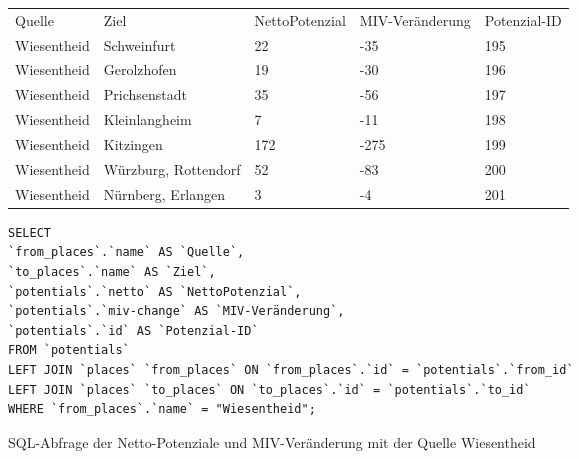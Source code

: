 \begin{tabular}{ l  l  l  l  l }
Quelle & Ziel & NettoPotenzial & MIV-Veränderung & Potenzial-ID\\ 
Wiesentheid & Schweinfurt & 22 & -35 & 195\\ 
Wiesentheid & Gerolzhofen & 19 & -30 & 196\\ 
Wiesentheid & Prichsenstadt & 35 & -56 & 197\\ 
Wiesentheid & Kleinlangheim & 7 & -11 & 198\\ 
Wiesentheid & Kitzingen & 172 & -275 & 199\\ 
Wiesentheid & Würzburg, Rottendorf & 52 & -83 & 200\\ 
Wiesentheid & Nürnberg, Erlangen & 3 & -4 & 201\\ 
\end{tabular}    
\newline
\newline
\begin{listing}[htbp]
\begin{verbatim}
SELECT
`from_places`.`name` AS `Quelle`, 
`to_places`.`name` AS `Ziel`, 
`potentials`.`netto` AS `NettoPotenzial`, 
`potentials`.`miv-change` AS `MIV-Veränderung`, 
`potentials`.`id` AS `Potenzial-ID`
FROM `potentials`
LEFT JOIN `places` `from_places` ON `from_places`.`id` = `potentials`.`from_id`
LEFT JOIN `places` `to_places` ON `to_places`.`id` = `potentials`.`to_id`
WHERE `from_places`.`name` = "Wiesentheid";
\end{verbatim}
\caption{SQL-Abfrage der Netto-Potenziale und MIV-Veränderung mit der Quelle Wiesentheid}\label{lst-fz-wiesentheid}
\end{listing}